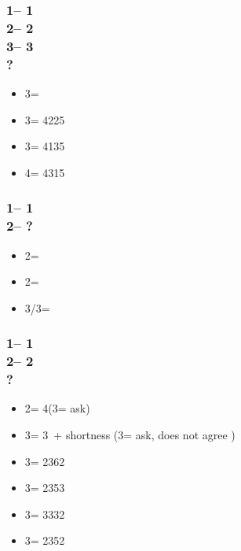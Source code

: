 \documentclass[12pt, a4paper]{report}
\begin{document}
{{{            \subsubsection*{1\clubs -- 1\spades\\
                            2\spades -- 2\nt\\
                            3\clubs -- 3\diams\\
                            ?}
            \begin{itemize}
                \item 3\hearts = \bal
                \item 3\spades = 4225
                \item 3\nt = 4135
                \item 4\clubs = 4315
            \end{itemize}

            \subsubsection*{1\diams -- 1\hearts\\
                            2\hearts -- ?}
            \begin{itemize}
                \item 2\spades = \gf
                \item 2\nt = \inv\ \spades
                \item 3\minor/3\hearts = \inv
            \end{itemize}

            \subsubsection*{1\diams -- 1\hearts\\
                            2\hearts -- 2\spades\\
                            ?}
            \begin{itemize}
                \item 2\nt = 4\hearts (3\clubs = ask)
                \item 3\clubs = 3\hearts\ + shortness (3\diams = ask, does not agree \hearts)
                \item 3\diams = 2362
                \item 3\hearts = 2353
                \item 3\spades = 3332
                \item 3\nt = 2352
            \end{itemize}

}}}
\end{document}
